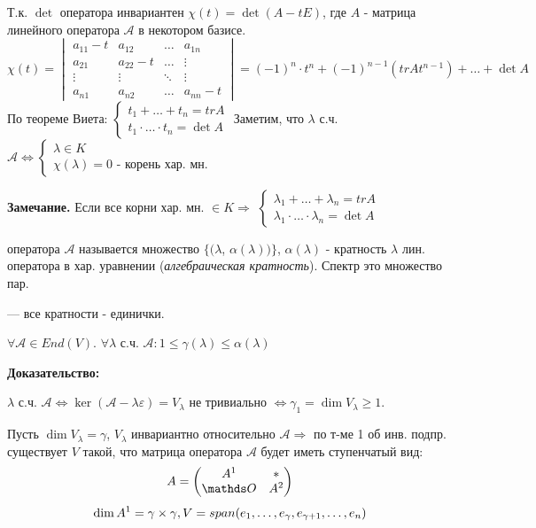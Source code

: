 Т.к. $\det$ оператора инвариантен $\chi(t) = \det (A - tE)$, где $A$ - матрица линейного оператора $\mathcal{A}$ в некотором базисе.
$$\chi(t) =\begin{vmatrix}
    a_{11} -t & a_{12} & \ldots & a_{1n} \\
    a_{21} & a_{22}-t & \ldots & \vdots\\
    \vdots & \vdots & \ddots & \vdots\\
    a_{n1} & a_{n2} & \ldots & a_{nn}-t
\end{vmatrix} = (-1)^{n}\cdot t^n + (-1)^{n-1}(tr At^{n-1}) + \ldots + \det A$$
По теореме Виета:
$\begin{cases}
t_1 +\ldots+t_n = tr A\\
t_1\cdot \ldots \cdot t_n = \det A
\end{cases}$
Заметим, что $\lambda$ с.ч. $\mathcal{A} \Leftrightarrow\begin{cases}
    \lambda \in K\\
    \chi(\lambda) = 0 \text{ - корень хар. мн.}
\end{cases}$

\textbf{Замечание.} Если все корни хар. мн. $\in K \Rightarrow$ $\begin{cases}
\lambda_1 +\ldots+\lambda_n = tr A\\
\lambda_1\cdot \ldots \cdot \lambda_n = \det A
\end{cases}$

  оператора $\mathcal{A}$ называется множество $\{ (\lambda$, $\alpha(\lambda)) \}$, 
$\alpha(\lambda)$ - кратность $\lambda$ лин. оператора в хар. уравнении (\emph{алгебраическая кратность}). Спектр это множество пар.

  --- все кратности -  единички.



$\forall \mathcal{A}\in End(V)$. $\forall \lambda$ с.ч. $\mathcal{A} : 1\leq \gamma(\lambda)\leq \alpha(\lambda)$

\textbf{Доказательство:}

$\lambda$ с.ч. $\mathcal{A} \Leftrightarrow \ker(\mathcal{A}-\lambda \varepsilon)= V_{\lambda}$ не тривиально $\Leftrightarrow \gamma_1=\dim V_\lambda\geq 1$.

Пусть $\dim V_{\lambda} = \gamma$, $V_{\lambda}$ инвариантно относительно $\mathcal{A} \Rightarrow$ по т-ме 1 об инв. подпр. существует $V$ такой, что матрица оператора $\mathcal{A}$ будет иметь ступенчатый вид:
$$A =\begin{pmatrix}
    A^1 & *\\
    \zero & A^2
\end{pmatrix}$$
$$\dim A^1 = \gamma \times \gamma,V = span(e_1,\ldots, e_{\gamma},e_{\gamma+1},\ldots,e_{n})$$

